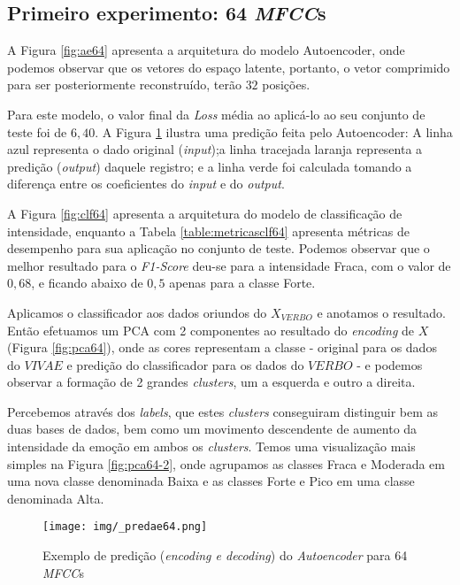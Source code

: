\subsection{Primeiro experimento: 64 \textit{MFCC}s}

A Figura \ref{fig:ae64} apresenta a arquitetura do modelo Autoencoder, onde podemos observar que os vetores do espaço latente, portanto, o vetor comprimido para ser posteriormente reconstruído, terão $32$ posições.

Para este modelo, o valor final da \textit{Loss} média ao aplicá-lo ao seu conjunto de teste foi de $6,40$. A Figura \ref{fig:predae64} ilustra uma predição feita pelo Autoencoder: A linha azul representa o dado original (\textit{input});a linha tracejada laranja representa a predição (\textit{output}) daquele registro; e a linha verde foi calculada tomando a diferença entre os coeficientes do \textit{input} e do \textit{output}.


A Figura \ref{fig:clf64} apresenta a arquitetura do modelo de classificação de intensidade, enquanto a Tabela \ref{table:metricasclf64} apresenta métricas de desempenho para sua aplicação no conjunto de teste. Podemos observar que o melhor resultado para o \textit{F1-Score} deu-se para a intensidade Fraca, com o valor de $0,68$, e ficando abaixo de $0,5$ apenas para a classe Forte.

Aplicamos o classificador aos dados oriundos do $X_{VERBO}$ e anotamos o resultado. Então efetuamos um \acrshort{PCA} com 2 componentes ao resultado do \textit{encoding} de $X$ (Figura \ref{fig:pca64}), onde as cores representam a classe - original para os dados do $VIVAE$ e predição do classificador para os dados do $VERBO$ - e podemos observar a formação de 2 grandes \textit{clusters}, um a esquerda e outro a direita.

Percebemos através dos \textit{labels}, que estes \textit{clusters} conseguiram distinguir bem as duas bases de dados, bem como um movimento descendente de aumento da intensidade da emoção em ambos os \textit{clusters}. Temos uma visualização mais simples na Figura \ref{fig:pca64-2}, onde agrupamos as classes Fraca e Moderada em uma nova classe denominada Baixa e as classes Forte e Pico em uma classe denominada Alta.

\begin{figure}%
    \centering
    \texttt{[image: img/\_predae64.png]}
    \caption{\label{fig:predae64}Exemplo de predição (\textit{encoding e decoding}) do \textit{Autoencoder} para 64 \textit{MFCC}s}
\end{figure}

